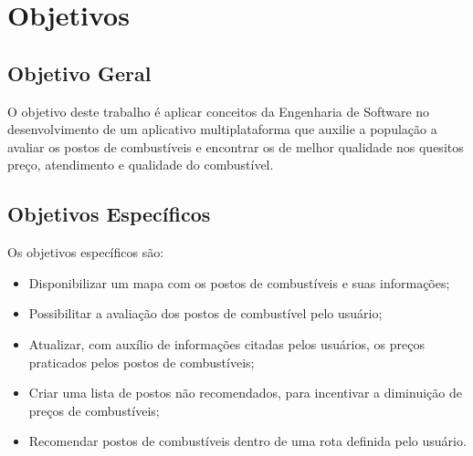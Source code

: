 \section{Objetivos}

\subsection{Objetivo Geral}

O objetivo deste trabalho é aplicar conceitos da Engenharia de Software no desenvolvimento de um aplicativo multiplataforma que auxilie a população a avaliar os postos de combustíveis e encontrar os de melhor qualidade nos quesitos preço, atendimento e qualidade do combustível.

\subsection{Objetivos Específicos}

Os objetivos específicos são:
\begin{itemize}
    \item Disponibilizar um mapa com os postos de combustíveis e suas informações;
    \item Possibilitar a avaliação dos postos de combustível pelo usuário;
    \item Atualizar, com auxílio de informações citadas pelos usuários, os preços praticados pelos postos de combustíveis;
    \item Criar uma lista de postos não recomendados, para incentivar a diminuição de preços de combustíveis;
    \item Recomendar postos de combustíveis dentro de uma rota definida pelo usuário.
\end{itemize}
